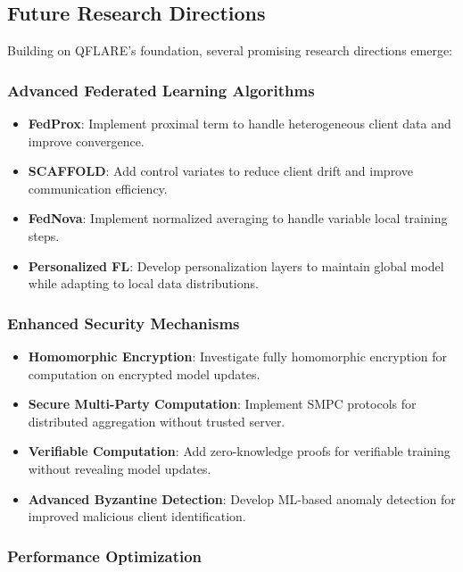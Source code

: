 \documentclass[12pt,a4paper]{article}
\begin{document}
\subsection{Future Research Directions}

Building on QFLARE's foundation, several promising research directions emerge:

\subsubsection{Advanced Federated Learning Algorithms}

\begin{itemize}
    \item \textbf{FedProx}: Implement proximal term to handle heterogeneous client data and improve convergence.
    \item \textbf{SCAFFOLD}: Add control variates to reduce client drift and improve communication efficiency.
    \item \textbf{FedNova}: Implement normalized averaging to handle variable local training steps.
    \item \textbf{Personalized FL}: Develop personalization layers to maintain global model while adapting to local data distributions.
\end{itemize}

\subsubsection{Enhanced Security Mechanisms}

\begin{itemize}
    \item \textbf{Homomorphic Encryption}: Investigate fully homomorphic encryption for computation on encrypted model updates.
    \item \textbf{Secure Multi-Party Computation}: Implement SMPC protocols for distributed aggregation without trusted server.
    \item \textbf{Verifiable Computation}: Add zero-knowledge proofs for verifiable training without revealing model updates.
    \item \textbf{Advanced Byzantine Detection}: Develop ML-based anomaly detection for improved malicious client identification.
\end{itemize}

\subsubsection{Performance Optimization}
\end{document}
